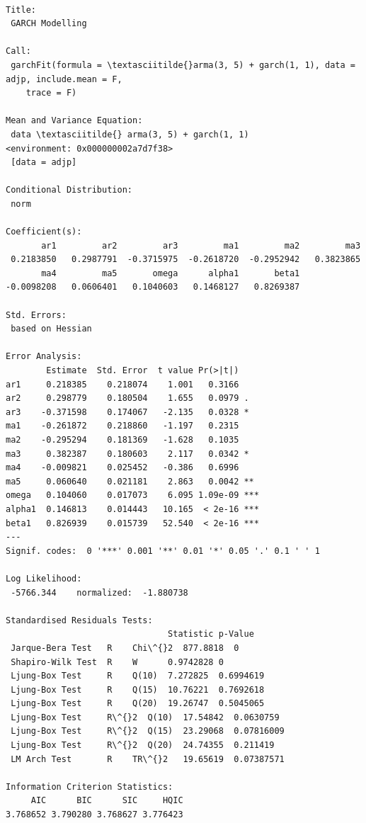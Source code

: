 \documentclass[11pt]{article}
\begin{document}
    \begin{Verbatim}[commandchars=\\\{\}]

Title:
 GARCH Modelling

Call:
 garchFit(formula = \textasciitilde{}arma(3, 5) + garch(1, 1), data = adjp, include.mean = F,
    trace = F)

Mean and Variance Equation:
 data \textasciitilde{} arma(3, 5) + garch(1, 1)
<environment: 0x000000002a7d7f38>
 [data = adjp]

Conditional Distribution:
 norm

Coefficient(s):
       ar1         ar2         ar3         ma1         ma2         ma3
 0.2183850   0.2987791  -0.3715975  -0.2618720  -0.2952942   0.3823865
       ma4         ma5       omega      alpha1       beta1
-0.0098208   0.0606401   0.1040603   0.1468127   0.8269387

Std. Errors:
 based on Hessian

Error Analysis:
        Estimate  Std. Error  t value Pr(>|t|)
ar1     0.218385    0.218074    1.001   0.3166
ar2     0.298779    0.180504    1.655   0.0979 .
ar3    -0.371598    0.174067   -2.135   0.0328 *
ma1    -0.261872    0.218860   -1.197   0.2315
ma2    -0.295294    0.181369   -1.628   0.1035
ma3     0.382387    0.180603    2.117   0.0342 *
ma4    -0.009821    0.025452   -0.386   0.6996
ma5     0.060640    0.021181    2.863   0.0042 **
omega   0.104060    0.017073    6.095 1.09e-09 ***
alpha1  0.146813    0.014443   10.165  < 2e-16 ***
beta1   0.826939    0.015739   52.540  < 2e-16 ***
---
Signif. codes:  0 '***' 0.001 '**' 0.01 '*' 0.05 '.' 0.1 ' ' 1

Log Likelihood:
 -5766.344    normalized:  -1.880738

Standardised Residuals Tests:
                                Statistic p-Value
 Jarque-Bera Test   R    Chi\^{}2  877.8818  0
 Shapiro-Wilk Test  R    W      0.9742828 0
 Ljung-Box Test     R    Q(10)  7.272825  0.6994619
 Ljung-Box Test     R    Q(15)  10.76221  0.7692618
 Ljung-Box Test     R    Q(20)  19.26747  0.5045065
 Ljung-Box Test     R\^{}2  Q(10)  17.54842  0.0630759
 Ljung-Box Test     R\^{}2  Q(15)  23.29068  0.07816009
 Ljung-Box Test     R\^{}2  Q(20)  24.74355  0.211419
 LM Arch Test       R    TR\^{}2   19.65619  0.07387571

Information Criterion Statistics:
     AIC      BIC      SIC     HQIC
3.768652 3.790280 3.768627 3.776423

    \end{Verbatim}
\end{document}
